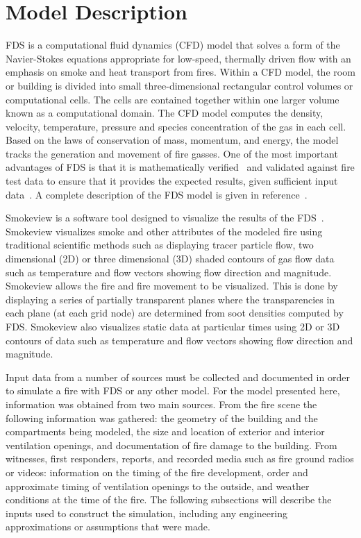 \documentclass[11pt,oneside]{book}
\begin{document}
\chapter{Model Description}
\label{model}
FDS is a computational fluid dynamics (CFD) model that solves a form of the Navier-Stokes equations appropriate for low-speed, thermally driven flow with an emphasis on smoke and heat transport from fires.  Within a CFD model, the room or building is divided into small three-dimensional rectangular control volumes or computational cells.  The cells are contained together within one larger volume known as a computational domain.  The CFD model computes the density, velocity, temperature, pressure and species concentration of the gas in each cell.  Based on the laws of conservation of mass, momentum,  and energy, the model tracks the generation and movement of fire gasses. One of the most important advantages of FDS is that it is  mathematically verified~\cite{FDS_Verification_Guide} and validated against fire test data to ensure that it provides the expected results, given sufficient input data~\cite{FDS_Validation_Guide}.  A complete description of the FDS model is given in reference~\cite{FDS_Math_Guide}.

Smokeview is a software tool designed to visualize the results of the FDS~\cite{Smokeview_Users_Guide}.  Smokeview visualizes smoke and other attributes of the modeled fire using traditional scientific methods such as displaying tracer particle flow, two dimensional (2D) or three dimensional (3D) shaded contours of gas flow data such as temperature and flow vectors showing flow direction and magnitude.  Smokeview allows the fire and fire movement to be visualized.  This is done by displaying a series of partially transparent planes where the transparencies in each plane (at each grid node) are determined from soot densities computed by FDS.  Smokeview also visualizes static data at particular times using 2D or 3D contours of data such as temperature and flow vectors showing flow direction and magnitude.

Input data from a number of sources must be collected and documented in order to simulate a fire with FDS or any other model. For the model presented here, information was obtained from two main sources. From the fire scene the following information was gathered: the geometry of the building and the compartments being modeled, the size and location of exterior and interior ventilation openings, and documentation of fire damage to the building. From witnesses, first responders, reports, and recorded media such as fire ground radios or videos: information on the timing of the fire development, order and approximate timing of ventilation openings to the outside, and weather conditions at the time of the fire. The following subsections will describe the inputs used to construct the simulation, including any engineering approximations or assumptions that were made.
\end{document}
